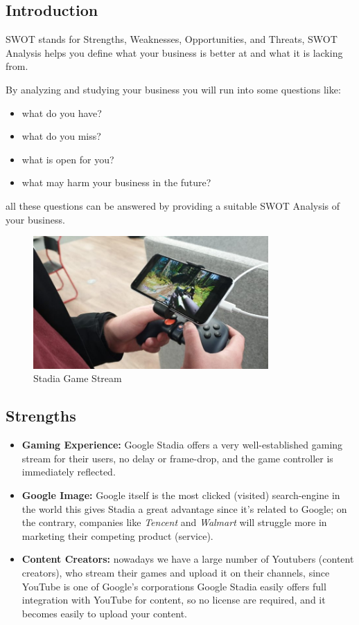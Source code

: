 \subsection{Introduction}

SWOT stands for Strengths, Weaknesses, Opportunities, and Threats, SWOT Analysis helps you define
what your business is better at and what it is lacking from.

By analyzing and studying your business you will run into some questions like:
{
\renewcommand\labelitemi{}
\begin{itemize}
    \item what do you have?
    \item what do you miss?
    \item what is open for you?
    \item what may harm your business in the future?
\end{itemize}
}
all these questions can be answered by providing a suitable SWOT Analysis of your business.

\begin{figure}[h]
    \centering
    \includegraphics[width=0.8\textwidth]{images/stream.jpg}
    \caption{Stadia Game Stream}
    \label{fig:stream}
\end{figure}

\subsection{Strengths}
    \begin{itemize}
        \item \textbf{Gaming Experience:}
            Google Stadia offers a very well-established gaming stream for 
            their users, no delay or frame-drop, and the game controller is immediately reflected.
        \item \textbf{Google Image:}
            Google itself is the most clicked (visited) search-engine in the world
            this gives Stadia a great advantage since it's related to Google; on the contrary, companies
            like \emph{Tencent} and \emph{Walmart} will struggle more in marketing their competing product (service).
        \item \textbf{Content Creators:} 
            nowadays we have a large number of Youtubers (content creators), who stream their games and 
            upload it on their channels, since YouTube is one of Google's corporations Google Stadia
            easily offers full integration with YouTube for content, so no license are required, and 
            it becomes easily to upload your content.
    \end{itemize}

